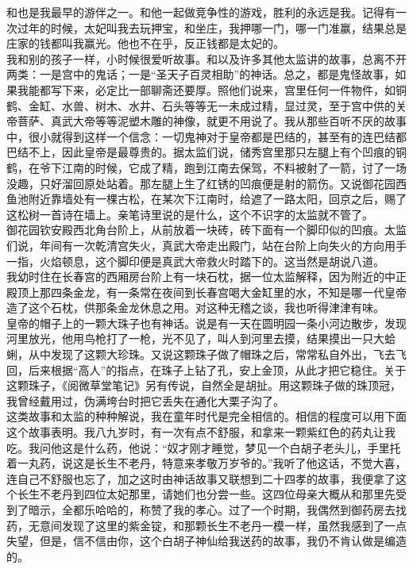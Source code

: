 和也是我最早的游伴之一。和他一起做竞争性的游戏，胜利的永远是我。记得有一次过年的时候，太妃叫我去玩押宝，和坐庄，我押哪一门，哪一门准赢，结果总是庄家的钱都叫我赢光。他也不在乎，反正钱都是太妃的。\\

我和别的孩子一样，小时候很爱听故事。和以及许多其他太监讲的故事，总离不开两类：一是宫中的鬼话；一是“圣天子百灵相助”的神话。总之，都是鬼怪故事，如果我能都写下来，必定比一部聊斋还要厚。照他们说来，宫里任何一件物件，如铜鹤、金缸、水兽、树木、水井、石头等等无一未成过精，显过灵，至于宫中供的关帝菩萨、真武大帝等等泥塑木雕的神像，就更不用说了。我从那些百听不厌的故事中，很小就得到这样一个信念：一切鬼神对于皇帝都是巴结的，甚至有的连巴结都巴结不上，因此皇帝是最尊贵的。据太监们说，储秀宫里那只左腿上有个凹痕的铜鹤，在爷下江南的时候，它成了精，跑到江南去保驾，不料被射了一箭，讨了一场没趣，只好溜回原处站着。那左腿上生了红锈的凹痕便是射的箭伤。又说御花园西鱼池附近靠墙处有一棵古松，在某次下江南时，给遮了一路太阳，回京之后，赐了这松树一首诗在墙上。亲笔诗里说的是什么，这个不识字的太监就不管了。\\

御花园钦安殿西北角台阶上，从前放着一块砖，砖下面有一个脚印似的凹痕。太监们说，年间有一次乾清宫失火，真武大帝走出殿门，站在台阶上向失火的方向用手一指，火焰顿息，这个脚印便是真武大帝救火时踏下的。这当然是胡说八道。\\

我幼时住在长春宫的西厢房台阶上有一块石枕，据一位太监解释，因为附近的中正殿顶上那四条金龙，有一条常在夜间到长春宫喝大金缸里的水，不知是哪一代皇帝造了这个石枕，供那条金龙休息之用。对这种无稽之谈，我也听得津津有味。\\

皇帝的帽子上的一颗大珠子也有神话。说是有一天在圆明园一条小河边散步，发现河里放光，他用鸟枪打了一枪，光不见了，叫人到河里去摸，结果摸出一只大蛤蜊，从中发现了这颗大珍珠。又说这颗珠子做了帽珠之后，常常私自外出，飞去飞回，后来根据“高人”的指点，在珠子上钻了孔，安上金顶，从此才把它稳住。关于这颗珠子，《阅微草堂笔记》另有传说，自然全是胡扯。用这颗珠子做的珠顶冠，我曾经戴用过，伪满垮台时把它丢失在通化大栗子沟了。\\

这类故事和太监的种种解说，我在童年时代是完全相信的。相信的程度可以用下面这个故事表明。我八九岁时，有一次有点不舒服，和拿来一颗紫红色的药丸让我吃。我问他这是什么药，他说：“奴才刚才睡觉，梦见一个白胡子老头儿，手里托着一丸药，说这是长生不老丹，特意来孝敬万岁爷的。”我听了他这话，不觉大喜，连自己不舒服也忘了，加之这时由神话故事又联想到二十四孝的故事，我便拿了这个长生不老丹到四位太妃那里，请她们也分尝一些。这四位母亲大概从和那里先受到了暗示，全都乐哈哈的，称赞了我的孝心。过了一个时期，我偶然到御药房去找药，无意间发现了这里的紫金锭，和那颗长生不老丹一模一样，虽然我感到了一点失望，但是，信不信由你，这个白胡子神仙给我送药的故事，我仍不肯认做是编造的。\\

